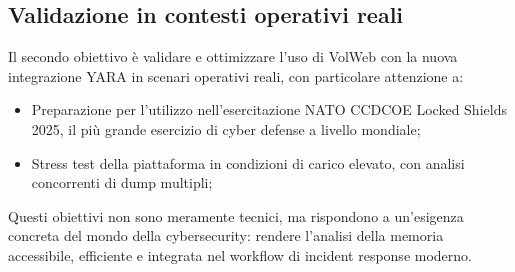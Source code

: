 \subsection{Validazione in contesti operativi reali}

Il secondo obiettivo è validare e ottimizzare l’uso di VolWeb con la nuova integrazione YARA in scenari operativi reali, con particolare attenzione a:

\begin{itemize}
\item Preparazione per l’utilizzo nell’esercitazione NATO CCDCOE Locked Shields 2025, il più grande esercizio di cyber defense a livello mondiale;
\item Stress test della piattaforma in condizioni di carico elevato, con analisi concorrenti di dump multipli;
\end{itemize}

Questi obiettivi non sono meramente tecnici, ma rispondono a un'esigenza concreta del mondo della cybersecurity: rendere l'analisi della memoria accessibile, efficiente e integrata nel workflow di incident response moderno.